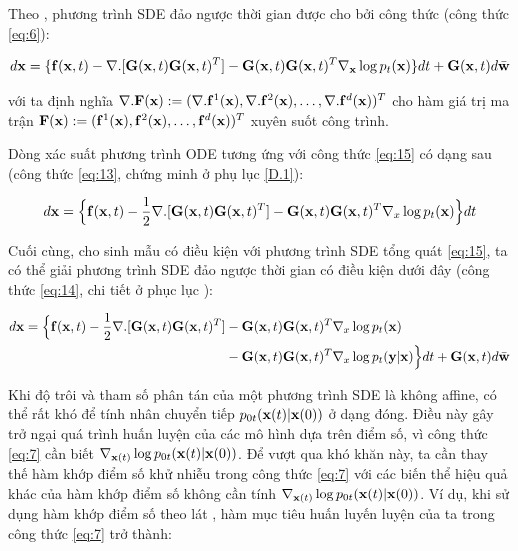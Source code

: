 \documentclass{article} %
\begin{document}
Theo \citep{anderson1982reverse}, phương trình SDE đảo ngược thời gian được cho bởi công thức (công thức \ref{eq:6}):

\begin{equation} \label{eq:16}
    d \bold{x} = \lbrace \bold{f}(\bold{x}, t) - \nabla . \lbrack \bold{G}(\bold{x}, t) \bold{G}(\bold{x}, t)^T \rbrack - \bold{G}(\bold{x}, t) \bold{G}(\bold{x}, t)^T \nabla_{\bold{x}} \log p_t(\bold{x}) \rbrace dt + \bold{G}(\bold{x}, t) d\bar{\bold{w}}
\end{equation}

với ta định nghĩa $\nabla . \bold{F}(\bold{x}) := (\nabla. \bold{f}^1 (\bold{x}), \nabla. \bold{f}^2 (\bold{x}), \dots, \nabla. \bold{f}^d (\bold{x}))^T$ cho hàm giá trị ma trận $\bold{F}(\bold{x}) := (\bold{f}^1 (\bold{x}), \bold{f}^2 (\bold{x}), \dots, \bold{f}^d (\bold{x}))^T$ xuyên suốt công trình.

Dòng xác suất phương trình ODE tương ứng với công thức \ref{eq:15} có dạng sau (công thức \ref{eq:13}, chứng minh ở phụ lục \ref{D.1}):

\begin{equation} \label{eq:17}
    d \bold{x} = \Big \lbrace \bold{f}(\bold{x}, t) - \dfrac{1}{2} \nabla . \lbrack \bold{G}(\bold{x}, t) \bold{G}(\bold{x}, t)^T  \rbrack - \bold{G}(\bold{x}, t) \bold{G}(\bold{x}, t)^T \nabla_{x} \log p_t(\bold{x}) \Big \rbrace dt
\end{equation}

Cuối cùng, cho sinh mẫu có điều kiện với phương trình SDE tổng quát \ref{eq:15}, ta có thể giải phương trình SDE đảo ngược thời gian có điều kiện dưới đây (công thức \ref{eq:14}, chi tiết ở phục lục ):\

\begin{equation} \label{eq:18}
    \begin{aligned}
        d \bold{x} = \Big \lbrace \bold{f}(\bold{x}, t) - \dfrac{1}{2} \nabla . \lbrack \bold{G}(\bold{x}, t) \bold{G}(\bold{x}, t)^T  \rbrack &- \bold{G}(\bold{x}, t) \bold{G}(\bold{x}, t)^T \nabla_{x} \log p_t(\bold{x}) \\
        & -\bold{G}(\bold{x}, t) \bold{G}(\bold{x}, t)^T \nabla_{x} \log p_t(\bold{y} \vert \bold{x})  \Big \rbrace dt + \bold{G}(\bold{x}, t) d \bar{\bold{w}}
    \end{aligned}
\end{equation}

Khi độ trôi và tham số phân tán của một phương trình SDE là không affine, có thể rất khó để tính nhân chuyển tiếp $p_{0t}(\bold{x}(t) \vert \bold{x}(0))$ ở dạng đóng.
Điều này gây trở ngại quá trình huấn luyện của các mô hình dựa trên điểm số, vì công thức \ref{eq:7} cần biết $\nabla_{\bold{x}(t)} \log p_{0t} (\bold{x}(t) \vert \bold{x}(0))$.
Để vượt qua khó khăn này, ta cần thay thế hàm khớp điểm số khử nhiễu trong công thức \ref{eq:7} với các biến thể hiệu quả khác của hàm khớp điểm số không cần tính $\nabla_{\bold{x}(t)} \log p_{0t} (\bold{x}(t) \vert \bold{x}(0))$.
Ví dụ, khi sử dụng hàm khớp điểm số theo lát \citep{song2020sliced}, hàm mục tiêu huấn luyến luyện của ta trong công thức \ref{eq:7} trở thành:
\end{document}
